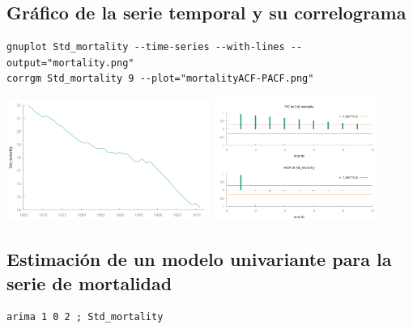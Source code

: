 \documentclass[10pt]{article}
\begin{document}
\subsection*{Gráfico de la serie temporal y su correlograma}
\label{sec:orgd0ebf41}

\begin{verbatim}
gnuplot Std_mortality --time-series --with-lines --output="mortality.png"
corrgm Std_mortality 9 --plot="mortalityACF-PACF.png"
\end{verbatim}


\begin{center}
\includegraphics[width=0.5\textwidth]{./mortality-marriages/mortality.png} 
\includegraphics[width=0.4\textwidth]{./mortality-marriages/mortalityACF-PACF.png} 
\end{center}
\subsection*{Estimación de un modelo univariante para la serie de mortalidad}
\label{sec:org63761db}

\begin{verbatim}
arima 1 0 2 ; Std_mortality
\end{verbatim}
\end{document}
